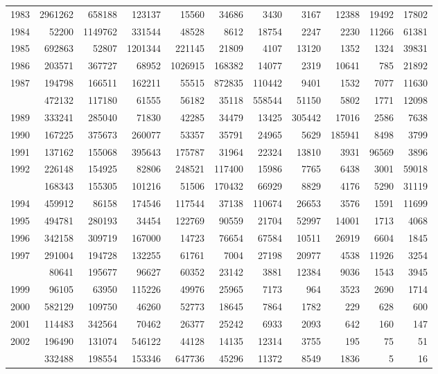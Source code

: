 \documentclass[
]{article}
\begin{document}
\begin{longtable}[t]{lrrrrrrrrrr}
1983 & 2961262 & 658188 & 123137 & 15560 & 34686 & 3430 & 3167 & 12388 & 19492 & 17802\\
1984 & 52200 & 1149762 & 331544 & 48528 & 8612 & 18754 & 2247 & 2230 & 11266 & 61381\\
1985 & 692863 & 52807 & 1201344 & 221145 & 21809 & 4107 & 13120 & 1352 & 1324 & 39831\\
1986 & 203571 & 367727 & 68952 & 1026915 & 168382 & 14077 & 2319 & 10641 & 785 & 21892\\
1987 & 194798 & 166511 & 162211 & 55515 & 872835 & 110442 & 9401 & 1532 & 7077 & 11630\\
\addlinespace
1988 & 472132 & 117180 & 61555 & 56182 & 35118 & 558544 & 51150 & 5802 & 1771 & 12098\\
1989 & 333241 & 285040 & 71830 & 42285 & 34479 & 13425 & 305442 & 17016 & 2586 & 7638\\
1990 & 167225 & 375673 & 260077 & 53357 & 35791 & 24965 & 5629 & 185941 & 8498 & 3799\\
1991 & 137162 & 155068 & 395643 & 175787 & 31964 & 22324 & 13810 & 3931 & 96569 & 3896\\
1992 & 226148 & 154925 & 82806 & 248521 & 117400 & 15986 & 7765 & 6438 & 3001 & 59018\\
\addlinespace
1993 & 168343 & 155305 & 101216 & 51506 & 170432 & 66929 & 8829 & 4176 & 5290 & 31119\\
1994 & 459912 & 86158 & 174546 & 117544 & 37138 & 110674 & 26653 & 3576 & 1591 & 11699\\
1995 & 494781 & 280193 & 34454 & 122769 & 90559 & 21704 & 52997 & 14001 & 1713 & 4068\\
1996 & 342158 & 309719 & 167000 & 14723 & 76654 & 67584 & 10511 & 26919 & 6604 & 1845\\
1997 & 291004 & 194728 & 132255 & 61761 & 7004 & 27198 & 20977 & 4538 & 11926 & 3254\\
\addlinespace
1998 & 80641 & 195677 & 96627 & 60352 & 23142 & 3881 & 12384 & 9036 & 1543 & 3945\\
1999 & 96105 & 63950 & 115226 & 49976 & 25965 & 7173 & 964 & 3523 & 2690 & 1714\\
2000 & 582129 & 109750 & 46260 & 52773 & 18645 & 7864 & 1782 & 229 & 628 & 600\\
2001 & 114483 & 342564 & 70462 & 26377 & 25242 & 6933 & 2093 & 642 & 160 & 147\\
2002 & 196490 & 131074 & 546122 & 44128 & 14135 & 12314 & 3755 & 195 & 75 & 51\\
\addlinespace
2003 & 332488 & 198554 & 153346 & 647736 & 45296 & 11372 & 8549 & 1836 & 5 & 16\\

\end{longtable}
\end{document}
